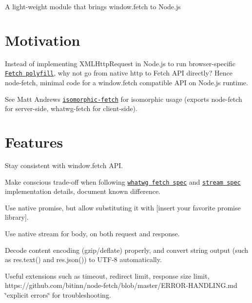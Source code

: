 \href{https://www.npmjs.com/package/node-fetch}{\tt } \href{https://travis-ci.org/bitinn/node-fetch}{\tt } \href{https://codecov.io/gh/bitinn/node-fetch}{\tt }

A light-\/weight module that brings {\ttfamily window.\+fetch} to Node.\+js

\section*{Motivation}

Instead of implementing {\ttfamily X\+M\+L\+Http\+Request} in Node.\+js to run browser-\/specific \href{https://github.com/github/fetch}{\tt Fetch polyfill}, why not go from native {\ttfamily http} to {\ttfamily Fetch} A\+PI directly? Hence {\ttfamily node-\/fetch}, minimal code for a {\ttfamily window.\+fetch} compatible A\+PI on Node.\+js runtime.

See Matt Andrews\textquotesingle{} \href{https://github.com/matthew-andrews/isomorphic-fetch}{\tt isomorphic-\/fetch} for isomorphic usage (exports {\ttfamily node-\/fetch} for server-\/side, {\ttfamily whatwg-\/fetch} for client-\/side).

\section*{Features}


\begin{DoxyItemize}
\item Stay consistent with {\ttfamily window.\+fetch} A\+PI.
\item Make conscious trade-\/off when following \href{https://fetch.spec.whatwg.org/}{\tt whatwg fetch spec} and \href{https://streams.spec.whatwg.org/}{\tt stream spec} implementation details, document known difference.
\item Use native promise, but allow substituting it with \mbox{[}insert your favorite promise library\mbox{]}.
\item Use native stream for body, on both request and response.
\item Decode content encoding (gzip/deflate) properly, and convert string output (such as {\ttfamily res.\+text()} and {\ttfamily res.\+json()}) to U\+T\+F-\/8 automatically.
\item Useful extensions such as timeout, redirect limit, response size limit, https\+://github.com/bitinn/node-\/fetch/blob/master/\+E\+R\+R\+O\+R-\/\+H\+A\+N\+D\+L\+I\+N\+G.\+md \char`\"{}explicit errors\char`\"{} for troubleshooting.
\end{DoxyItemize}


